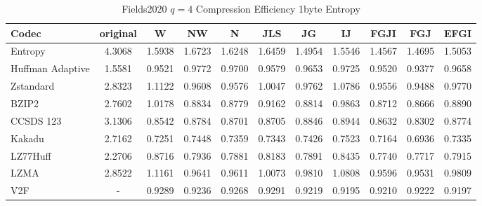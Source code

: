 \documentclass{article}
\begin{document}
\begin{table}[h!]
\centering
\caption{Fields2020 $q=4$ Compression Efficiency 1byte Entropy}
\begin{tabular}{|l|cccccccccc|}
\hline
Codec &  original &      W &     NW &      N &    JLS &     JG &     IJ &   FGJI &    FGJ &   EFGI \\
\hline
Entropy & 4.3068 & 1.5938 & 1.6723 & 1.6248 & 1.6459 & 1.4954 & 1.5546 & 1.4567 & 1.4695 & 1.5053 \\
\hline
Huffman Adaptive &    1.5581 & 0.9521 & 0.9772 & 0.9700 & 0.9579 & 0.9653 & 0.9725 & 0.9520 & 0.9377 & 0.9658 \\
Zstandard        &    2.8323 & 1.1122 & 0.9608 & 0.9576 & 1.0047 & 0.9762 & 1.0786 & 0.9556 & 0.9488 & 0.9770 \\
BZIP2            &    2.7602 & 1.0178 & 0.8834 & 0.8779 & 0.9162 & 0.8814 & 0.9863 & 0.8712 & 0.8666 & 0.8890 \\
CCSDS 123        &    3.1306 & 0.8542 & 0.8784 & 0.8701 & 0.8705 & 0.8846 & 0.8944 & 0.8632 & 0.8302 & 0.8774 \\
Kakadu           &    2.7162 & 0.7251 & 0.7448 & 0.7359 & 0.7343 & 0.7426 & 0.7523 & 0.7164 & 0.6936 & 0.7335 \\
LZ77Huff         &    2.2706 & 0.8716 & 0.7936 & 0.7881 & 0.8183 & 0.7891 & 0.8435 & 0.7740 & 0.7717 & 0.7915 \\
LZMA             &    2.8522 & 1.1161 & 0.9641 & 0.9611 & 1.0073 & 0.9810 & 1.0808 & 0.9596 & 0.9531 & 0.9809 \\
V2F              &    - & 0.9289 & 0.9236 & 0.9268 & 0.9291 & 0.9219 & 0.9195 & 0.9210 & 0.9222 & 0.9197 \\
\hline
\end{tabular}
\end{table}
\end{document}
